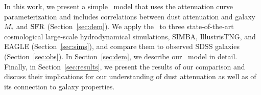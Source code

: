 In this work, we present a simple \eda~model that uses the \cite{noll2009}
attenuation curve parameterization and includes correlations between dust
attenuation and galaxy $M_*$ and ${\rm SFR}$ (Section~\ref{sec:dem}). We apply 
the \eda~to three state-of-the-art cosmological large-scale hydrodynamical 
simulations, SIMBA, IllustrisTNG, and EAGLE (Section~\ref{sec:sims}), and 
compare them to observed SDSS galaxies (Section~\ref{sec:obs}). In 
Section~\ref{sec:dem}, we describe our \eda~model in detail. Finally, in
Section~\ref{sec:results}, we present the results of our comparison and discuss 
their implications for our understanding of dust attenuation as well as of its
connection to galaxy properties. 
